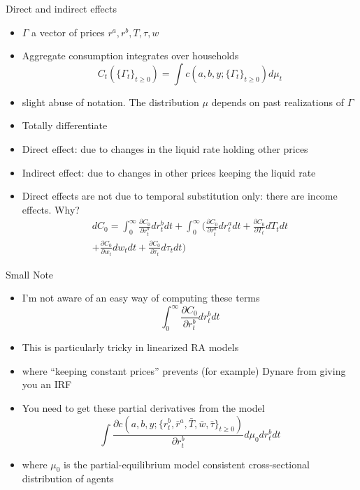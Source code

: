 \documentclass[english,xcolor=svgnames]{beamer}
\begin{document}
\begin{frame}{Direct and indirect effects}
\begin{itemize}
\item $\Gamma$ a vector of prices $r^a,r^b,T,\tau,w$
\item Aggregate consumption integrates over households
\[C_t(\{\Gamma_t\}_{t \geq 0}) = \int c(a,b,y;\{\Gamma_t\}_{t \geq 0})d \mu_t \]
\item slight abuse of notation. The distribution $\mu$ depends on past realizations of $\Gamma$
\item Totally differentiate
\end{itemize}
\end{frame}

\begin{frame}
\begin{itemize}
\item Direct effect: due to changes in the liquid rate holding  other prices
\item Indirect effect: due to changes in other prices keeping the liquid rate
\item Direct effects are not due to temporal substitution only: there are income effects. Why?
\begin{multline*}
dC_0 = \int_0^{\infty}\frac{\partial C_0}{\partial r^b_t} dr^b_t dt + \int_0^{\infty} (\frac{\partial C_0}{\partial r^a_t} dr^a_t dt + \frac{\partial C_0}{\partial T_t} dT_t dt \\ +\frac{\partial C_0}{\partial w_t} dw_t dt + \frac{\partial C_0}{\partial \tau_t} d \tau_t dt )
\end{multline*}
\end{itemize}
\end{frame}

\begin{frame}{Small Note}
\begin{itemize}
\item I'm not aware of an easy way of computing these terms
\[\int_0^{\infty}\frac{\partial C_0}{\partial r^b_t} dr^b_t dt\]
\item This is particularly tricky in linearized RA models
\item where ``keeping constant prices'' prevents (for example) Dynare from giving you an IRF
\item You need to get these partial derivatives from the model
\[\int \frac{\partial c(a,b,y;\{r^b_t, \bar{r}^a,\bar{T},\bar{w},\bar{\tau}\}_{t \geq 0})}{\partial r^b_t}d \mu_0 dr^b_t dt \]
\item where $\mu_0$ is the partial-equilibrium model consistent cross-sectional distribution of agents
\end{itemize}
\end{frame}
\end{document}

